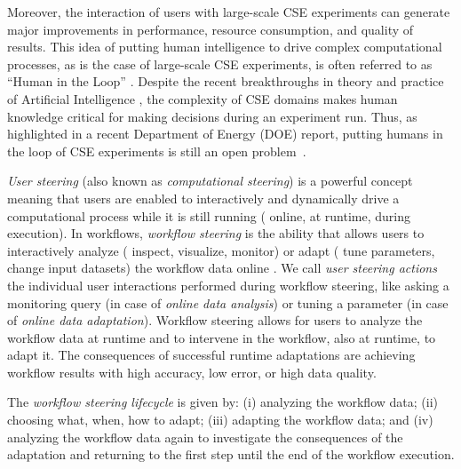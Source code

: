 
Moreover, the interaction of users with large-scale CSE experiments can generate major improvements in performance, resource consumption, and quality of results.  
This idea of putting human intelligence to drive complex computational processes, as is the case of large-scale CSE experiments, is often referred to as ``Human in the Loop'' \cite{jagadish_big_2014}.
Despite the recent breakthroughs in theory and practice of Artificial Intelligence \cite{russell2016artificial}, the complexity of CSE domains makes human knowledge critical for making decisions during an experiment run. Thus, as highlighted in a recent Department of Energy (DOE) report, putting humans in the loop of CSE experiments is still an open problem~\cite{deelman_future_2017}.

\textit{User steering} (also known as \textit{computational steering}) is a powerful concept meaning that users are enabled to interactively and dynamically drive a computational process while it is still running (\ie{} online, at runtime, during execution).  In workflows, \textit{workflow steering} is the ability that allows users to interactively analyze (\eg{} inspect, visualize, monitor) or adapt (\eg{} tune parameters, change input datasets) the workflow data online \cite{Mattoso2015Dynamic, Souza2017Data}. We call \textit{user steering actions}
the individual user interactions performed during workflow steering, like asking a monitoring query (in case of \textit{online data analysis}) or tuning a parameter (in case of \textit{online data adaptation}).
Workflow steering allows for users to analyze the workflow data at runtime and to intervene in the workflow, also at runtime, to adapt it. The  consequences of successful runtime adaptations are achieving workflow results with high accuracy, low error, or high data quality.



The \textit{workflow steering lifecycle} is given by:
(i) analyzing the workflow data;
(ii) choosing what, when, how to adapt; 
(iii) adapting the workflow data; and
(iv) analyzing the workflow data again to investigate the consequences of the adaptation and returning to the first step until the end of the workflow execution.

